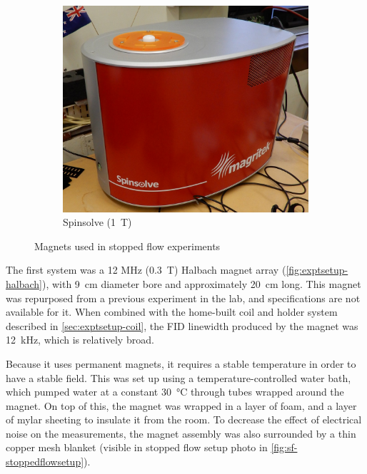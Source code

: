\begin{figure}[t]
\begin{subfigure}[t]{0.4\textwidth}
\includegraphics[width=\textwidth]{figures/exptsetup/spinsolve.jpg}
\caption{Spinsolve (\SI{1}{T})}
\label{fig:exptsetup-spinsolve}
\end{subfigure}
\caption{Magnets used in stopped flow experiments}
\label{fig:exptsetup-stopflowmagnets}
\end{figure}

The first system was a 12 MHz (\SI{0.3}{T}) Halbach magnet array (\autoref{fig:exptsetup-halbach}), with \SI{9}{cm} diameter bore and approximately \SI{20}{\centi\metre} long.
This magnet was repurposed from a previous experiment in the lab, and specifications are not available for it.
When combined with the home-built coil and holder system described in \autoref{sec:exptsetup-coil}, the FID linewidth produced by the magnet was \SI{12}{\kilo\hertz}, which is relatively broad.

Because it uses permanent magnets, it requires a stable temperature in order to have a stable field.
This was set up using a temperature-controlled water bath, which pumped water at a constant \SI{30}{\celsius} through tubes wrapped around the magnet.
On top of this, the magnet was wrapped in a layer of foam, and a layer of mylar sheeting to insulate it from the room.
To decrease the effect of electrical noise on the measurements, the magnet assembly was also surrounded by a thin copper mesh blanket (visible in stopped flow setup photo in \autoref{fig:sf-stoppedflowsetup}).


